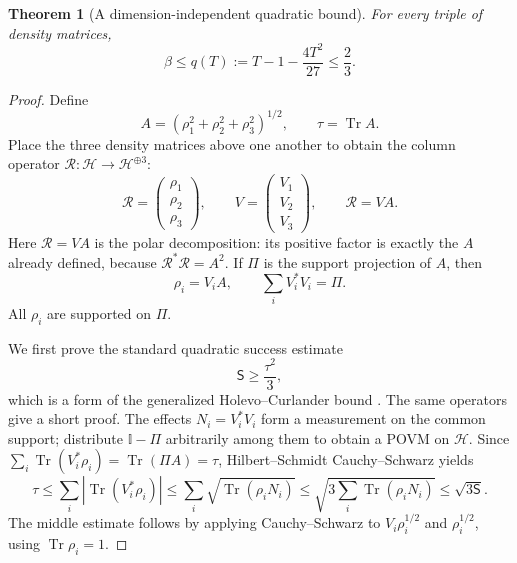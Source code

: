 \documentclass[a4paper,11pt,onecolumn,unpublished]{quantumarticle}
\newtheorem{theorem}{Theorem}[section]
\theoremstyle{definition}
\newcommand{\Tr}{\operatorname{Tr}}
\newcommand{\id}{\mathbb I}
\newcommand{\1}{\mathbf 1}
\newcommand{\Sopt}{\mathsf S}
\begin{document}
\begin{theorem}[A dimension-independent quadratic bound]\label{thm:two-thirds}
For every triple of density matrices,
\begin{equation}\label{eq:quadratic-bound}
 \beta\le q(T):=T-1-\frac{4T^2}{27}\le\frac23.
\end{equation}
\end{theorem}
\begin{proof}
Define
\[
 A=(\rho_1^2+\rho_2^2+\rho_3^2)^{1/2},\qquad\tau=\Tr A.
\]
Place the three density matrices above one another to obtain the column
operator $\mathcal R:\mathcal H\to\mathcal H^{\oplus3}$:
\begin{equation}\label{eq:column}
 \mathcal R=\begin{pmatrix}\rho_1\\\rho_2\\\rho_3\end{pmatrix},
 \qquad V=\begin{pmatrix}V_1\\V_2\\V_3\end{pmatrix},
 \qquad\mathcal R=VA.
\end{equation}
Here $\mathcal R=VA$ is the polar decomposition: its positive factor is exactly
the $A$ already defined, because $\mathcal R^*\mathcal R=A^2$. If $\Pi$ is the
support projection of $A$, then
\begin{equation}\label{eq:polar-identities}
 \rho_i=V_iA,\qquad\sum_iV_i^*V_i=\Pi.
\end{equation}
All $\rho_i$ are supported on $\Pi$.

We first prove the standard quadratic success estimate
\begin{equation}\label{eq:HC}
 \Sopt\ge\frac{\tau^2}{3},
\end{equation}
which is a form of the generalized Holevo--Curlander bound
\cite{Tyson2009}. The same operators give a short proof. The effects
$N_i=V_i^*V_i$ form a measurement on the common support; distribute
$\id-\Pi$ arbitrarily among them to obtain a POVM on $\mathcal H$.
Since $\sum_i\Tr(V_i^*\rho_i)=\Tr(\Pi A)=\tau$, Hilbert--Schmidt
Cauchy--Schwarz yields
\[
 \tau\le\sum_i|\Tr(V_i^*\rho_i)|
 \le\sum_i\sqrt{\Tr(\rho_iN_i)}
 \le\sqrt{3\sum_i\Tr(\rho_iN_i)}\le\sqrt{3\Sopt}.
\]
The middle estimate follows by applying Cauchy--Schwarz to
$V_i\rho_i^{1/2}$ and $\rho_i^{1/2}$, using $\Tr\rho_i=1$.


\end{proof}
\end{document}
